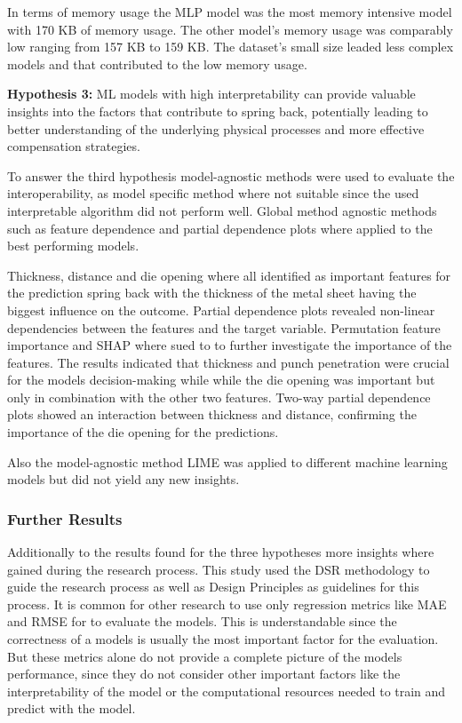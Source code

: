 In terms of memory usage the MLP model was the most memory intensive model with 170 KB of memory usage.
The other model's memory usage was comparably low ranging from 157 KB to 159 KB.
The dataset's small size leaded less complex models and that contributed to the low memory usage.

\textbf{Hypothesis 3:} ML models with high interpretability can provide valuable insights into the factors that
contribute to spring back, potentially leading to better understanding of the underlying physical processes and
more effective compensation strategies.

To answer the third hypothesis model-agnostic methods were used to evaluate the interoperability, as model specific
method where not suitable since the used interpretable algorithm did not perform well.
Global method agnostic methods such as feature dependence and partial dependence plots where applied to the best
performing models.

Thickness, distance and die opening where all identified as important features for the prediction spring back with the
thickness of the metal sheet having the biggest influence on the outcome.
Partial dependence plots revealed non-linear dependencies between the features and the target variable.
Permutation feature importance and SHAP where sued to to further investigate the importance of the features.
The results indicated that thickness and punch penetration were crucial for the models decision-making while while the
die opening was important but only in combination with the other two features.
Two-way partial dependence plots showed an interaction between thickness and distance, confirming the importance of the
die opening for the predictions.

Also the model-agnostic method LIME was applied to different machine learning models but did not yield any new insights.

\subsubsection*{Further Results}
Additionally to the results found for the three hypotheses more insights where gained during the research process.
This study used the \ac{DSR} methodology to guide the research process as well as Design Principles as guidelines for
this process.
It is common for other research to use only regression metrics like MAE and RMSE for to evaluate the models.
This is understandable since the correctness of a models is usually the most important factor for the evaluation.
But these metrics alone do not provide a complete picture of the models performance, since they do not consider
other important factors like the interpretability of the model or the computational resources needed to train and
predict with the model.

